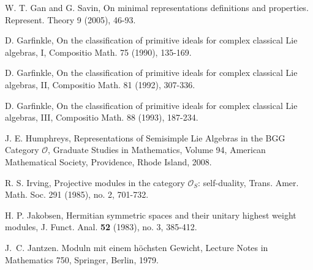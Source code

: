 \documentclass{amsart}[12pt]
\numberwithin{equation}{section}
\begin{document}
\begin{thebibliography}{99}
W. T. Gan and G. Savin, On minimal representations definitions and properties. Represent. Theory 9 (2005), 46-93.



D. Garfinkle, On the classification of primitive ideals for complex classical Lie algebras, I, Compositio Math. 75 (1990), 135-169.


D. Garfinkle, On the classification of primitive ideals for complex classical Lie algebras, II, Compositio Math. 81 (1992), 307-336.

D. Garfinkle, On the classification of primitive ideals for complex classical Lie algebras, III, Compositio Math. 88 (1993), 187-234.


 J. E. Humphreys, {Representations of Semisimple Lie Algebras in the BGG Category $\mathscr{O}$}, Graduate Studies in Mathematics, Volume 94, American Mathematical Society, Providence, Rhode Island, 2008.


 R. S.  Irving, Projective modules in the category $\mathscr{O}_S$: self-duality,
Trans. Amer. Math. Soc. 291 (1985), no. 2, 701-732.




%
%
%
%
H. P. Jakobsen, Hermitian symmetric spaces and their unitary highest weight modules, J. Funct. Anal. {\bf 52} (1983), no. 3, 385-412.
%

J.~C. Jantzen.
Moduln mit einem h\"ochsten Gewicht, 
Lecture Notes in Mathematics 750,
Springer, Berlin, 1979.






\end{thebibliography}
\end{document}
